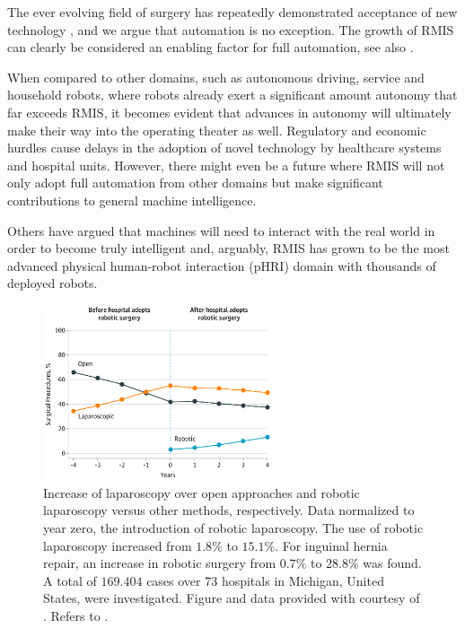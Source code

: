 The ever evolving field of surgery has repeatedly demonstrated acceptance of new technology \cite{attanasio2021autonomoy}, and we argue that automation is no exception. The growth of RMIS can clearly be considered an enabling factor for full automation, see also .

When compared to other domains, such as autonomous driving, service and household robots, where robots already exert a significant amount autonomy that far exceeds RMIS, it becomes evident that advances in autonomy will ultimately make their way into the operating theater as well. Regulatory and economic hurdles cause delays in the adoption of novel technology by healthcare systems and hospital units. However, there might even be a future where RMIS will not only adopt full automation from other domains but make significant contributions to general machine intelligence. 

Others \cite{lecun2022path} have argued that machines will need to interact with the real world in order to become truly intelligent and, arguably, RMIS has grown to be the most advanced physical human-robot interaction (pHRI) domain with thousands of deployed robots.
\begin{figure}[t]
    \centering
    \includegraphics[width=0.6\textwidth]{introduction/img/robotic_since_introduction.png}
    \caption{Increase of laparoscopy over open approaches and robotic laparoscopy versus other methods, respectively. Data normalized to year zero, the introduction of robotic laparoscopy. The use of robotic laparoscopy increased from $1.8\%$ to $15.1\%$. For inguinal hernia repair, an increase in robotic surgery from $0.7\%$ to $28.8\%$ was found. A total of $169.404$ cases over 73 hospitals in Michigan, United States, were investigated. Figure and data provided with courtesy of \cite{sheetz2020trends}. Refers to .}
    \label{in:fig:robotic_vs_laparoscopic_vs_open}
\end{figure}

